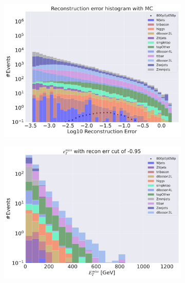 \begin{figure}[H]
    \centering
    \begin{subfigure}{.40\textwidth}
        \includegraphics[width=\textwidth]{Figures/AE_testing/big/3lep/b_data_recon_big_rm3_feats_sig_800p0p050p.pdf}
        \caption{ }
        \label{fig:AE_3lep_big_800_2}
    \end{subfigure}
    \hfill
    \begin{subfigure}{.40\textwidth}
        \includegraphics[width=\textwidth]{Figures/AE_testing/big/3lep/b_data_recon_big_rm3_feats_sig_800p0p050p_etmiss_recon_errcut_-0.95.pdf}
        \caption{}
        \label{fig:AE_3lep_big_etmiss_800_2}
    \end{subfigure}

\end{figure}
